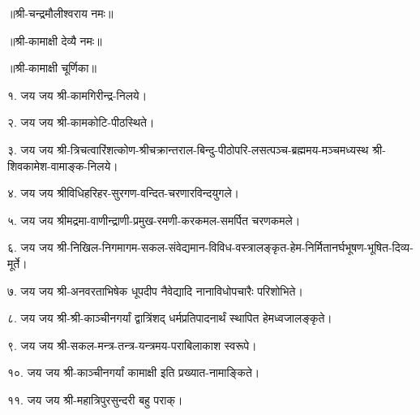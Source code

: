 ॥श्री-चन्द्रमौलीश्वराय नमः॥

॥श्री-कामाक्षी देव्यै नमः॥

॥श्री-कामाक्षी चूर्णिका॥

१. जय जय श्री-कामगिरीन्द्र-निलये।

२. जय जय श्री-कामकोटि-पीठस्थिते।

३. जय जय श्री-त्रिचत्वारिंशत्कोण-श्रीचक्रान्तराल-बिन्दु-पीठोपरि-लसत्पञ्च-ब्रह्ममय-मञ्चमध्यस्थ श्री-शिवकामेश-वामाङ्क-निलये।

४. जय जय श्रीविधिहरिहर-सुरगण-वन्दित-चरणारविन्दयुगले।

५. जय जय श्रीमद्रमा-वाणीन्द्राणी-प्रमुख-रमणी-करकमल-समर्पित चरणकमले।

६. जय जय श्री-निखिल-निगमागम-सकल-संवेद्यमान-विविध-वस्त्रालङ्कृत-हेम-निर्मितानर्घभूषण-भूषित-दिव्य-मूर्ते।

७. जय जय श्री-अनवरताभिषेक धूपदीप नैवेद्यादि नानाविधोपचारैः परिशोभिते।

८. जय जय श्री-श्री-काञ्चीनगर्यां द्वात्रिंशद् धर्मप्रतिपादनार्थं स्थापित हेमध्वजालङ्कृते।

९. जय जय श्री-सकल-मन्त्र-तन्त्र-यन्त्रमय-पराबिलाकाश स्वरूपे।

१०. जय जय श्री-काञ्चीनगर्यां कामाक्षी इति प्रख्यात-नामाङ्किते।

११. जय जय श्री-महात्रिपुरसुन्दरी बहु पराक्।